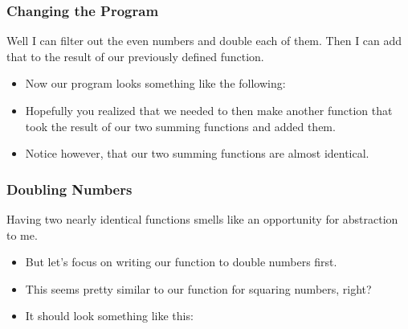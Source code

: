 \documentclass{beamer}
\begin{document}
\begin{frame}
  \frametitle{Changing the Program}
 Well I can filter out the even numbers and double each of them.
 Then I can add that to the result of our previously defined function.
 \begin{itemize}
 \item<2-> Now our program looks something like the following:
   \newStructure
 \item<3-> Hopefully you realized that we needed to then make another function
   that took the result of our two summing functions and added them.
 \item<4-> Notice however, that our two summing functions are almost identical.
 \end{itemize}
\end{frame}



\begin{frame}
  \frametitle{Doubling Numbers}
  Having two nearly identical functions smells like an opportunity for abstraction to me.
  \begin{itemize}
  \item<2-> But let's focus on writing our function to double numbers first.
  \item<3-> This seems pretty similar to our function for squaring numbers, right?
  \item<4-> It should look something like this:
    \doubleEach
  \end{itemize}
\end{frame}
\end{document}
